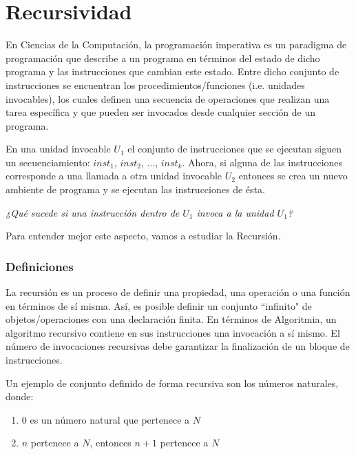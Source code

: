 \newpage
\part{Recursividad}
\setcounter{section}{0}

En Ciencias de la Computación, la programación imperativa es un paradigma de programación que describe a un programa en términos del estado de dicho programa y las instrucciones que cambian este estado. Entre dicho conjunto de instrucciones se encuentran los procedimientos/funciones (i.e. unidades invocables), los cuales definen una secuencia de operaciones que realizan una tarea específica y que pueden ser invocados desde cualquier sección de un programa.

En una unidad invocable $U_1$ el conjunto de instrucciones que se ejecutan siguen un secuenciamiento: $inst_1$, $inst_2$, ..., $inst_k$. Ahora, si alguna de las instrucciones corresponde a una llamada a otra unidad invocable $U_2$ entonces se crea un nuevo ambiente de programa y se ejecutan las instrucciones de ésta.

\begin{center}
	\textit{¿Qué sucede si una instrucción dentro de $U_1$ invoca a la unidad $U_1$?}
\end{center}

Para entender mejor este aspecto, vamos a estudiar la Recursión.


\section{Definiciones}

La recursión es un proceso de definir una propiedad, una operación o una función en términos de sí misma. Así, es posible definir un conjunto ``infinito" de objetos/operaciones con una declaración finita. En términos de Algoritmia, un algoritmo recursivo contiene en sus instrucciones una invocación a sí mismo. El número de invocaciones recursivas debe garantizar la finalización de un bloque de instrucciones.

Un ejemplo de conjunto definido de forma recursiva son los números naturales, donde:
\begin{enumerate}
\item $0$ es un número natural que pertenece a $N$
\item $n$ pertenece a $N$, entonces $n+1$ pertenece a $N$
\end{enumerate}

